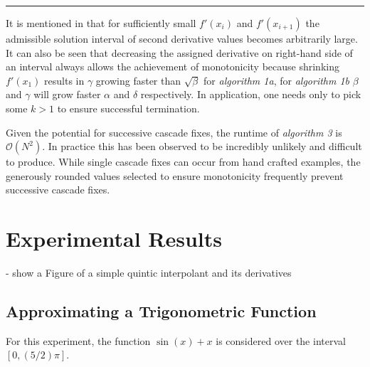 \documentclass{scspaperproc}
\theoremstyle{scsthe}
\begin{document}
\hrule
\vspace{10pt}

It is mentioned in \cite{ulrich1994positivity} that for sufficiently small $f'(x_i)$ and $f'(x_{i+1})$ the admissible solution interval of second derivative values becomes arbitrarily large. It can also be seen that decreasing the assigned derivative on right-hand side of an interval always allows the achievement of monotonicity because shrinking $f'(x_1)$ results in $\gamma$ growing faster than $\sqrt{\beta}$ for \textit{algorithm 1a}, for \textit{algorithm 1b} $\beta$ and $\gamma$ will grow faster $\alpha$ and $\delta$ respectively. In application, one needs only to pick some $k > 1$ to ensure successful termination.

Given the potential for successive cascade fixes, the runtime of \textit{algorithm 3} is $\mathcal{O}(N^2)$. In practice this has been observed to be incredibly unlikely and difficult to produce. While single cascade fixes can occur from hand crafted examples, the generously rounded values selected to ensure monotonicity frequently prevent successive cascade fixes.






\section{Experimental Results}

- show a Figure of a simple quintic interpolant and its derivatives

\subsection{Approximating a Trigonometric Function}

For this experiment, the function $\sin(x) + x$ is considered over the
interval $[0,(5/2)\pi]$.
\end{document}
